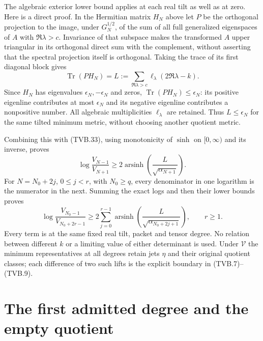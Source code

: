 \documentclass[11pt]{article}
\newcommand{\tr}{\operatorname{Tr}}
\begin{document}
The algebraic exterior lower bound applies at each real tilt as
well as at zero. Here is a direct proof. In the Hermitian matrix
$H_N$ above let $P$ be the orthogonal projection to the image,
under $G_N^{1/2}$, of the sum of all full generalized eigenspaces
of $A$ with $\Re\lambda>c$. Invariance of that subspace makes
the transformed $A$ upper triangular in its orthogonal direct sum
with the complement, without asserting that the spectral projection
itself is orthogonal. Taking the trace of its first diagonal block
gives
\[
 \tr(PH_N)=
 L:=\sum_{\Re\lambda>c}\ell_\lambda(2\Re\lambda-k).
\]
Since $H_N$ has eigenvalues $\epsilon_N,-\epsilon_N$ and zeros,
$\tr(PH_N)\le\epsilon_N$: its positive eigenline contributes
at most $\epsilon_N$ and its negative eigenline contributes a
nonpositive number. All algebraic multiplicities
$\ell_\lambda$ are retained. Thus $L\le\epsilon_N$ for the
same tilted minimum metric, without choosing another quotient
metric.

Combining this with (TVB.33), using monotonicity of $\sinh$ on
$[0,\infty)$ and its inverse, proves
\[
 \log\frac{V_{N-1}}{V_{N+1}}
 \ge2\operatorname{arsinh}\left(\frac{L}{\sqrt{\alpha_{N+1}}}\right).
 \tag{TVB.35}
\]
For $N=N_0+2j$, $0\le j<r$, with $N_0\ge q$, every denominator
in one logarithm is the numerator in the next. Summing the exact
logs and then their lower bounds proves
\[
 \log\frac{V_{N_0-1}}{V_{N_0+2r-1}}
 \ge2\sum_{j=0}^{r-1}
       \operatorname{arsinh}\left(
       \frac{L}{\sqrt{\alpha_{N_0+2j+1}}}\right),\qquad r\ge1.
 \tag{TVB.36}
\]
Every term is at the same fixed real tilt, packet and tensor degree.
No relation between different $k$ or a limiting value of either
determinant is used. Under $\mathcal V$ the minimum representatives
at all degrees retain jets $\eta$ and their original quotient
classes; each difference of two such lifts is the explicit boundary
in (TVB.7)--(TVB.9).

\section{The first admitted degree and the empty quotient}
\end{document}
